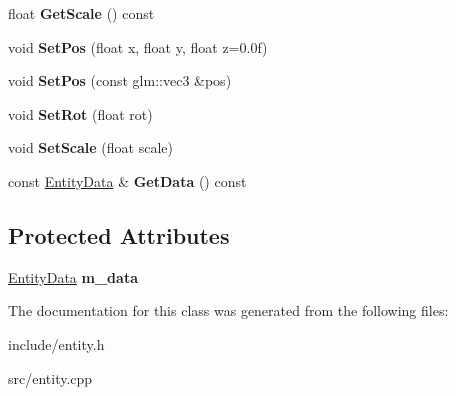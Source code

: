 \begin{DoxyCompactItemize}
\item 
\hypertarget{class_z_e_g_l_1_1_entity_ae74a51ca1aaac409c045be5511ada5c5}{}float {\bfseries Get\+Scale} () const \label{class_z_e_g_l_1_1_entity_ae74a51ca1aaac409c045be5511ada5c5}

\item 
\hypertarget{class_z_e_g_l_1_1_entity_af78fb1dfb0e5878802464486d0299348}{}void {\bfseries Set\+Pos} (float x, float y, float z=0.\+0f)\label{class_z_e_g_l_1_1_entity_af78fb1dfb0e5878802464486d0299348}

\item 
\hypertarget{class_z_e_g_l_1_1_entity_af41d770005e313b64e3141a5ca053076}{}void {\bfseries Set\+Pos} (const glm\+::vec3 \&pos)\label{class_z_e_g_l_1_1_entity_af41d770005e313b64e3141a5ca053076}

\item 
\hypertarget{class_z_e_g_l_1_1_entity_a1bb74f40f970621d73ffa40a46e54bbb}{}void {\bfseries Set\+Rot} (float rot)\label{class_z_e_g_l_1_1_entity_a1bb74f40f970621d73ffa40a46e54bbb}

\item 
\hypertarget{class_z_e_g_l_1_1_entity_ae3060c368e4fae9e3baec9147f5d5d84}{}void {\bfseries Set\+Scale} (float scale)\label{class_z_e_g_l_1_1_entity_ae3060c368e4fae9e3baec9147f5d5d84}

\item 
\hypertarget{class_z_e_g_l_1_1_entity_a656c356c7c35e01445ce543770c60e6f}{}const \hyperlink{struct_z_e_g_l_1_1_entity_data}{Entity\+Data} \& {\bfseries Get\+Data} () const \label{class_z_e_g_l_1_1_entity_a656c356c7c35e01445ce543770c60e6f}

\end{DoxyCompactItemize}
\subsection*{Protected Attributes}
\begin{DoxyCompactItemize}
\item 
\hypertarget{class_z_e_g_l_1_1_entity_a5f2e808fb78c9d7f4f16f755c4f598af}{}\hyperlink{struct_z_e_g_l_1_1_entity_data}{Entity\+Data} {\bfseries m\+\_\+data}\label{class_z_e_g_l_1_1_entity_a5f2e808fb78c9d7f4f16f755c4f598af}

\end{DoxyCompactItemize}


The documentation for this class was generated from the following files\+:\begin{DoxyCompactItemize}
\item 
include/entity.\+h\item 
src/entity.\+cpp\end{DoxyCompactItemize}
